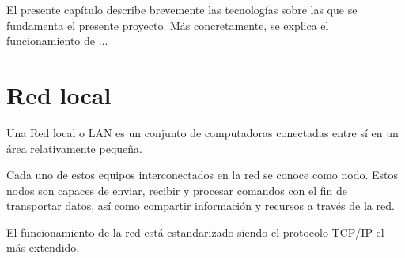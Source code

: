 

\label{chap:introduction}


El presente cap\'itulo describe brevemente las tecnolog\'ias sobre las que se fundamenta el presente proyecto. M\'as concretamente, se explica el funcionamiento de ...\newline

\chaptertoc

\section{Red local}

Una Red local o LAN es un conjunto de computadoras conectadas entre sí en un \'area relativamente peque\~na.


Cada uno de estos equipos interconectados en la red se conoce como nodo. Estos nodos son capaces de enviar, recibir y procesar comandos con el fin de transportar datos, así como compartir informaci\'on y recursos a través de la red.

El funcionamiento de la red está estandarizado siendo el protocolo TCP/IP el m\'as extendido.

